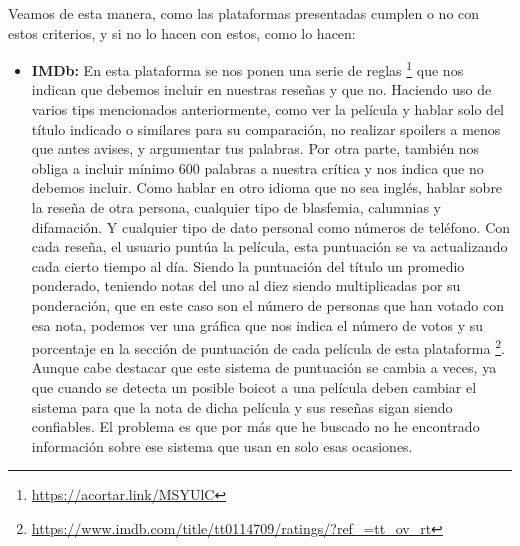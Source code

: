Veamos de esta manera, como las plataformas presentadas cumplen o no con estos criterios, y si no lo hacen con estos, como lo hacen:


\begin{itemize}
\item \textbf{IMDb:} En esta plataforma se nos ponen una serie de reglas \footnote{\url{https://acortar.link/MSYUlC}} que nos indican que debemos incluir en nuestras reseñas y que no. Haciendo uso de varios tips mencionados anteriormente, como ver la película y hablar solo del título indicado o similares para su comparación, no realizar spoilers a menos que antes avises, y argumentar tus palabras. Por otra parte, también nos obliga a incluir mínimo 600 palabras a nuestra crítica y nos indica que no debemos incluir. Como hablar en otro idioma que no sea inglés, hablar sobre la reseña de otra persona, cualquier tipo de blasfemia, calumnias y difamación. Y cualquier tipo de dato personal como números de teléfono. Con cada reseña, el usuario puntúa la película, esta puntuación se va actualizando cada cierto tiempo al día. Siendo la puntuación del título un promedio ponderado, teniendo notas del uno al diez siendo multiplicadas por su ponderación, que en este caso son el número de personas que han votado con esa nota, podemos ver una gráfica que nos indica el número de votos y su porcentaje en la sección de puntuación de cada película de esta plataforma \footnote{\url{https://www.imdb.com/title/tt0114709/ratings/?ref_=tt_ov_rt}}. Aunque cabe destacar que este sistema de puntuación se cambia a veces, ya que cuando se detecta un posible boicot a una película deben cambiar el sistema para que la nota de dicha película y sus reseñas sigan siendo confiables. El problema es que por más que he buscado no he encontrado información sobre ese sistema que usan en solo esas ocasiones.

\end{itemize}
